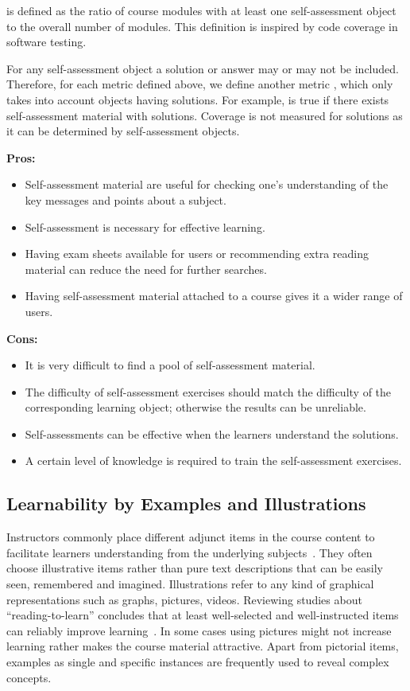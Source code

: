 \documentclass{sig-alternate}
\theoremstyle{definition}
\begin{document}
 is defined as the ratio of course modules with at least one self-assessment object to the overall number of modules.
This definition is inspired by code coverage in software testing.

For any self-assessment object a solution or answer may or may not be included.
Therefore, for each metric  defined above, we define another metric , which only takes into account objects having solutions.
For example,  is true if there exists self-assessment material with solutions.
Coverage is not measured for solutions as it can be determined by self-assessment objects.

\noindent\textbf{Pros:}
\begin{itemize}
\item Self-assessment material are useful for checking one's understanding of the key messages and points about a subject.
\item Self-assessment is necessary for effective learning.
\item Having exam sheets available for users or recommending extra reading material can reduce the need for further searches.
\item Having self-assessment material attached to a course gives it a wider range of users.
\end{itemize}
\noindent\textbf{Cons:}
\begin{itemize}
\item It is very difficult to find a pool of self-assessment material.
\item The difficulty of self-assessment exercises should match the difficulty of the corresponding learning object; otherwise the results can be unreliable.
\item Self-assessments can be effective when the learners understand the solutions.
\item A certain level of knowledge is required to train the self-assessment exercises.
\end{itemize}

\subsection{Learnability by Examples and Illustrations}
\label{sec:illustration}
Instructors commonly place different adjunct items in the course content to facilitate learners understanding from the underlying subjects~\parencite{Hayes.1983}.
They often choose illustrative items rather than pure text descriptions that can be easily seen, remembered and imagined.
Illustrations refer to any kind of graphical representations such as graphs, pictures, videos.
Reviewing studies about ``reading-to-learn'' concludes that at least well-selected and well-instructed items can reliably improve learning~\parencite{Carney.2002}.
In some cases using pictures might not increase learning rather makes the course material attractive.
Apart from pictorial items, examples as single and specific instances are frequently used to reveal complex concepts.
\end{document}
